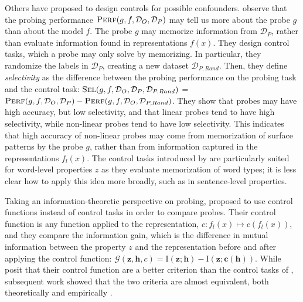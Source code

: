 \documentclass[discussion]{clv3}
\begin{document}
Others have proposed to design controls for possible confounders. \citet{hewitt-liang-2019-designing} observe that the probing performance  $\textsc{Perf}(g, f, \mathcal{D}_O, \mathcal{D}_P)$ may tell us more about the probe $g$ than about the model $f$. The probe $g$ may memorize information from $\mathcal{D}_P$, rather than evaluate information found in representations $f(x)$.   They design control tasks, which a probe may only solve by memorizing. In particular, they randomize the labels in  $\mathcal{D}_P$, creating a new dataset  $\mathcal{D}_{P,Rand}$. Then, they define \emph{selectivity} as the difference between the probing performance on the probing task and the control task:  $\textsc{Sel}(g, f, \mathcal{D}_O, \mathcal{D}_P, \mathcal{D}_{P,Rand})$ =  $\textsc{Perf}(g, f, \mathcal{D}_O, \mathcal{D}_P) - \textsc{Perf}(g, f, \mathcal{D}_O, \mathcal{D}_{P,Rand})$. They show that probes may have high accuracy, but low selectivity, and that linear probes tend to have high selectivity, while non-linear probes tend to have low selectivity. This indicates that high accuracy of non-linear probes may come from memorization of surface patterns by the probe $g$, rather than from information captured in the representations $f_l(x)$. 
The control tasks introduced by \citeauthor{hewitt-liang-2019-designing} are particularly suited for word-level properties $z$ as they evaluate memorization of word types; it is less clear how to apply this idea more broadly, such as in sentence-level properties. 

Taking an information-theoretic perspective on probing, \citet{pimentel-etal-2020-information} proposed to use control functions instead of control tasks in order to compare probes. Their control function is any function applied to the representation, $c : f_l(x) \mapsto c(f_l(x))$, and they compare the information gain, which is the difference in mutual information between the property $z$ and the representation before and after applying the control function:  $ \mathcal{G}(\mathbf{z}, \mathbf{h}, c) =   \mathrm{I}(\mathbf{z} ; \mathbf{h}) - \mathrm{I}(\mathbf{z} ; \mathbf{c(h)})$. 
While \citet{pimentel-etal-2020-information} posit that their control function are a better criterion than the control tasks of \citet{hewitt-liang-2019-designing}, subsequent work showed that the two criteria are almost equivalent, both theoretically and empirically \cite{zhu-rudzicz-2020-information}. 
\end{document}
